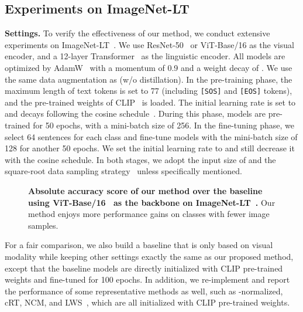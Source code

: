 \documentclass[runningheads]{llncs}
\begin{document}
\subsection{Experiments on ImageNet-LT}
\label{sec:imnet_lt}





\noindent\textbf{Settings.} To verify the effectiveness of our method, we conduct extensive experiments on ImageNet-LT~\cite{liu2019large}.
We use ResNet-50~\cite{he2016deep} or ViT-Base/16\cite{dosovitskiy2020image} as the visual encoder, and a 12-layer Transformer~\cite{radford2019language} as the linguistic encoder.
All models are optimized by AdamW~\cite{loshchilov2017decoupled} with a momentum of 0.9 and a weight decay of .
We use the same data augmentation as \cite{touvron2020training} (w/o distillation).
In the pre-training phase, the maximum length of text tokens is set to 77 (including \texttt{[SOS]} and \texttt{[EOS]} tokens), and the pre-trained weights of CLIP~\cite{clip} is loaded. The initial learning rate is set to  and decays following the cosine schedule~\cite{loshchilov2016sgdr}. During this phase, models are pre-trained for 50 epochs, with a mini-batch size of 256.
In the fine-tuning phase, we select 64 sentences for each class and fine-tune models with the mini-batch size of 128 for another 50 epochs. We set the initial learning rate to  and still decrease it with the cosine schedule.
In both stages, we adopt the input size of  and the square-root data sampling strategy~\cite{mahajan2018exploring,mikolov2013distributed}  unless specifically mentioned.

\begin{wrapfigure}{r}{0.59\textwidth}
\begin{center}
    \setlength{\fboxrule}{0pt}
    	\end{center}
\caption{
    \textbf{Absolute accuracy score of our method over the baseline using ViT-Base/16~\cite{dosovitskiy2020image} as the backbone on ImageNet-LT~\cite{liu2019large}.}
	Our method enjoys more performance gains on classes with fewer image samples.
    }
    \label{fig:range_acc}
\end{wrapfigure}

For a fair comparison, we also build a baseline that is only based on visual modality while keeping other settings exactly the same as our proposed method, except that the baseline models are directly initialized with CLIP pre-trained weights and fine-tuned for 100 epochs.
In addition, we re-implement and report the performance of some representative methods as well, such as -normalized, cRT, NCM, and LWS~\cite{kang2019decoupling}, which are all initialized with CLIP pre-trained weights.
\end{document}

